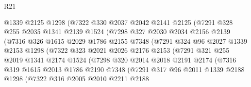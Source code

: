 \begin{lexlean}{R21}
\begin{coremodule}
                  @1339
                  @2125
                  @1298
                  (@7322
                    @330
                    @2037
                    @2042
                    @2141
                    @2125
                    (@7291
                      @328
                      @255
                      @2035
                      @1341
                      @2139
                      @1524
                      (@7298
                        @327
                        @2030
                        @2034
                        @2156
                        @2139
                        (@7316
                          @326
                          @1615
                          @2029
                          @1786
                          @2155
                          @7348
                          (@7291
                            @324
                            @96
                            @2027
                            @1339
                            @2153
                            @1298
                            (@7322
                              @323
                              @2021
                              @2026
                              @2176
                              @2153
                              (@7291
                                @321
                                @255
                                @2019
                                @1341
                                @2174
                                @1524
                                (@7298
                                  @320
                                  @2014
                                  @2018
                                  @2191
                                  @2174
                                  (@7316
                                    @319
                                    @1615
                                    @2013
                                    @1786
                                    @2190
                                    @7348
                                    (@7291
                                      @317
                                      @96
                                      @2011
                                      @1339
                                      @2188
                                      @1298
                                      (@7322
                                        @316
                                        @2005
                                        @2010
                                        @2211
                                        @2188

\end{coremodule}
\end{lexlean}
